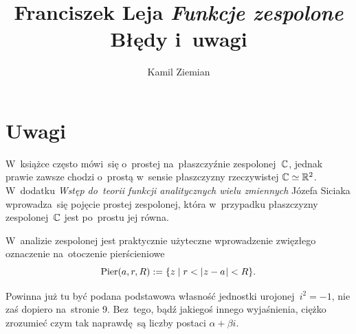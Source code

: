 \documentclass[a4paper,11pt]{article}
\title{Franciszek Leja \textit{Funkcje zespolone}
  \parencite{Leja-Funkcje-zespolone-Pub-2006} \\
  {\Large Błędy i~uwagi}}
\author{Kamil Ziemian}
\numberwithin{equation}{section}
\begin{document}





\maketitle





\section{Uwagi}


\noindent
W~książce często mówi~się o~prostej na~płaszczyźnie zespolonej~$\mathbb{C}$,
jednak prawie zawsze chodzi o~prostą w~sensie płaszczyzny rzeczywistej
$\mathbb{C} \simeq \mathbb{R}^{ 2 }$. W~dodatku \textit{Wstęp do~teorii funkcji
  analitycznych wielu zmiennych} Józefa Siciaka wprowadza~się pojęcie
prostej zespolonej, która w~przypadku płaszczyzny zespolonej~$\mathbb{C}$ jest
po~prostu jej równa.

\VerSpaceFour





\noindent
W~analizie zespolonej jest praktycznie użyteczne wprowadzenie zwięzłego
oznaczenie na~otoczenie pierścieniowe
\begin{equation}
  \label{eq:Leja-Funkcje-zespolone-01}
  \operatorname{Pier}( a, r, R ) := \{ z \; | \; r < | \hspace{0.05em}  z - a  \hspace{0.05em} | < R \}.
\end{equation}

\VerSpaceFour





\noindent
{} Powinna już tu być podana podstawowa własność jednostki
urojonej~$i^{ 2 } = -1$, nie zaś dopiero na~stronie 9. Bez~tego, bądź
jakiegoś innego wyjaśnienia, ciężko zrozumieć czym tak naprawdę~są
liczby postaci $\alpha + \beta i$.

\VerSpaceFour
\end{document}
